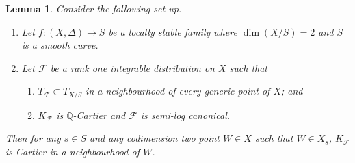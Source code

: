 \documentclass[12pt, a4paper]{amsart}
\newtheorem{lemma}[theorem]{Lemma}
\theoremstyle{definition}
\theoremstyle{named}
\begin{document}
\begin{lemma}
\label{lem_Cartier_criterion}
Consider the following set up.
\begin{enumerate}
\item Let $f\colon (X, \Delta) \rightarrow S$ be a locally stable family where $\dim (X/S) = 2$ and $S$ is a smooth curve. 
\item Let $\mathcal F$ be a rank one integrable distribution
 on 
$X$ such that 
\begin{enumerate}
    \item  $T_{\mathcal F} \subset T_{X/S}$ in a neighbourhood of every generic point of $X$; and 
    \item $K_{\mathcal F}$ is $\mathbb Q$-Cartier and $\mathcal F$ is 
semi-log canonical.
\end{enumerate}
\end{enumerate}

Then for any $s \in S$ and any codimension two point $W \in X$ such that $W \in X_s$, $K_{\mathcal F}$
is Cartier in a neighbourhood of $W$.
\end{lemma}
\end{document}
